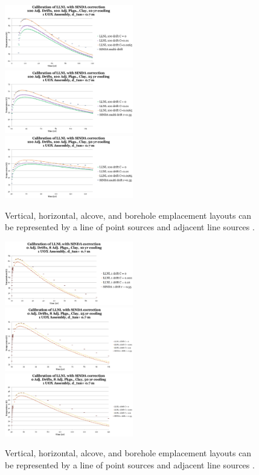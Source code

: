 \documentclass{anstrans}
\begin{document}
\begin{figure}[h!]
  \centering
    \includegraphics[width=0.5\textwidth]{100drift10yr.eps}
    \includegraphics[width=0.5\textwidth]{100drift25yr.eps}
    \includegraphics[width=0.5\textwidth]{100drift50yr.eps}
  \caption{Vertical, horizontal, alcove, and borehole emplacement layouts can be 
  represented by a line of point sources and adjacent line sources 
  \cite{sutton_investigations_2011}.}
  \label{fig:llnl}
\end{figure}

\begin{figure}[h!]
  \centering
    \includegraphics[width=0.5\textwidth]{1drift10yr.eps}
    \includegraphics[width=0.5\textwidth]{1drift25yr.eps}
    \includegraphics[width=0.5\textwidth]{1drift50yr.eps}
  \caption{Vertical, horizontal, alcove, and borehole emplacement layouts can be 
  represented by a line of point sources and adjacent line sources 
  \cite{sutton_investigations_2011}.}
  \label{fig:llnl}
\end{figure}
\end{document}
